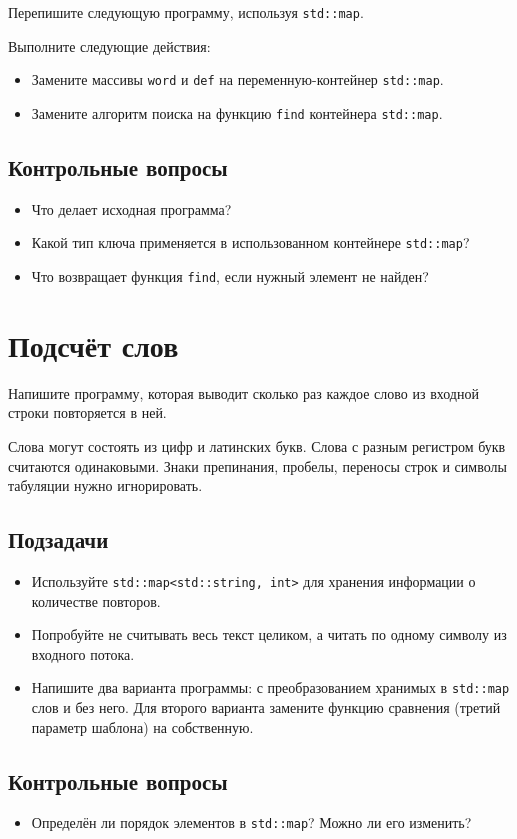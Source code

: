 \documentclass[10pt,twoside,openany]{book}
\begin{document}
Перепишите следующую программу, используя {\tt std::map}.

Выполните следующие действия:
\begin{itemize}
    \item Замените массивы {\tt word} и {\tt def} на переменную-контейнер {\tt std::map}.
    \item Замените алгоритм поиска на функцию {\tt find} контейнера {\tt std::map}.
\end{itemize}



\subsection*{Контрольные вопросы}

\begin{itemize}
    \item Что делает исходная программа?
    \item Какой тип ключа применяется в использованном контейнере {\tt std::map}?
    \item Что возвращает функция {\tt find}, если нужный элемент не найден?
\end{itemize}

\section{Подсчёт слов}

Напишите программу, которая выводит сколько раз каждое слово из входной строки повторяется в ней.

Слова могут состоять из цифр и латинских букв. Слова с разным регистром букв считаются одинаковыми.
Знаки препинания, пробелы, переносы строк и символы табуляции нужно игнорировать.

\subsection*{Подзадачи}

\begin{itemize}
    \item Используйте {\tt std::map<std::string, int>} для хранения информации о количестве повторов.
    \item Попробуйте не считывать весь текст целиком, а читать по одному символу из входного потока.
    \item Напишите два варианта программы: с преобразованием хранимых в {\tt std::map} слов и без него.
          Для второго варианта замените функцию сравнения (третий параметр шаблона) на собственную.
\end{itemize}

\subsection*{Контрольные вопросы}

\begin{itemize}
    \item Определён ли порядок элементов в {\tt std::map}? Можно ли его изменить?
\end{itemize}
\end{document}
